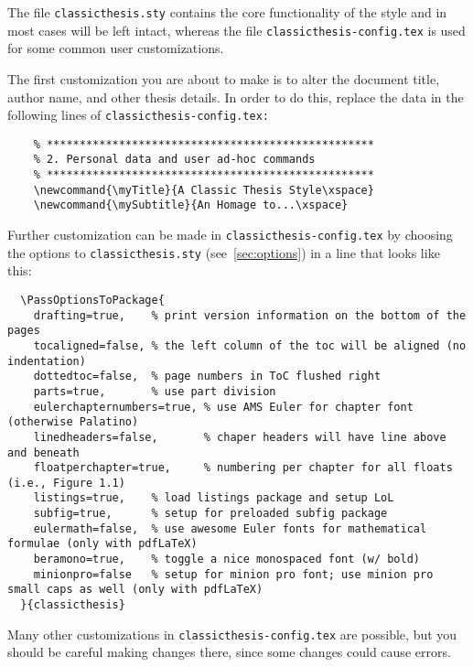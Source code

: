 The file \texttt{classicthesis.sty}
contains the core functionality of the style and in most cases will
be left intact, whereas the file \texttt{classic\-thesis-config.tex}
is used for some common user customizations.

The first customization you are about to make is to alter the document
title, author name, and other thesis details. In order to do this, replace
the data in the following lines of \texttt{classicthesis-config.tex:}%

\begin{lstlisting}
    % **************************************************
    % 2. Personal data and user ad-hoc commands
    % **************************************************
    \newcommand{\myTitle}{A Classic Thesis Style\xspace}
    \newcommand{\mySubtitle}{An Homage to...\xspace}
\end{lstlisting}

Further customization can be made in \texttt{classicthesis-config.tex}
by choosing the options to \texttt{classicthesis.sty}
(see~\autoref{sec:options}) in a line that looks like this:

\begin{lstlisting}
  \PassOptionsToPackage{
    drafting=true,    % print version information on the bottom of the pages
    tocaligned=false, % the left column of the toc will be aligned (no indentation)
    dottedtoc=false,  % page numbers in ToC flushed right
    parts=true,       % use part division
    eulerchapternumbers=true, % use AMS Euler for chapter font (otherwise Palatino)
    linedheaders=false,       % chaper headers will have line above and beneath
    floatperchapter=true,     % numbering per chapter for all floats (i.e., Figure 1.1)
    listings=true,    % load listings package and setup LoL
    subfig=true,      % setup for preloaded subfig package
    eulermath=false,  % use awesome Euler fonts for mathematical formulae (only with pdfLaTeX)
    beramono=true,    % toggle a nice monospaced font (w/ bold)
    minionpro=false   % setup for minion pro font; use minion pro small caps as well (only with pdfLaTeX)
  }{classicthesis}
\end{lstlisting}

Many other customizations in \texttt{classicthesis-config.tex} are
possible, but you should be careful making changes there, since some
changes could cause errors.



